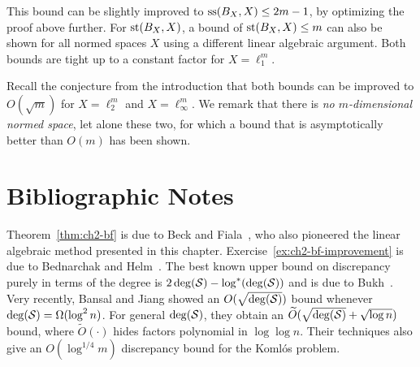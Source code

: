 
\remark
This bound can be slightly improved to \(\operatorname{ss}(B_X, X)\le 2m-1\), by optimizing the proof above further.
For $\operatorname{st}(B_X, X)$, a bound of \(\operatorname{st}(B_X, X) \le m\) can also be shown for all
normed spaces \(X\) using a different linear algebraic argument. Both bounds are tight up to a constant factor for \(X =
\ell_1^m\). 

Recall the conjecture from the introduction that both bounds can be improved to
\(O(\sqrt{m})\) for \(X = \ell_2^m\) and \(X = \ell_\infty^m\). We remark that
there is \emph{no \(m\)-dimensional normed space}, let alone these
two, for which a bound that is asymptotically better than \(O(m)\) has been shown. 

\section{Bibliographic Notes}

Theorem~\ref{thm:ch2-bf} is due to Beck and Fiala~\cite{BF81}, who
also pioneered the linear algebraic method presented in this
chapter. Exercise~\ref{ex:ch2-bf-improvement} is due to Bednarchak and
Helm~\cite{BH97-beckfiala}. The best known upper bound on discrepancy purely in terms of
the degree is $2\operatorname{deg}(\mathcal{S}) - \log^*(\operatorname{deg}(\mathcal{S}))$ and is due to
Bukh~\cite{Bukh16}. Very recently, Bansal and Jiang showed an $O(\sqrt{\operatorname{deg}(\mathcal{S})})$ bound whenever $\operatorname{deg}(\mathcal{S}) = \Omega(\log^2n)$. For general $\operatorname{deg}(\mathcal{S})$, they obtain an $\widetilde{O}(\sqrt{\operatorname{deg}(\mathcal{S})} + \sqrt{\log n})$ bound, where $\widetilde{O}(\cdot)$ hides factors polynomial in $\log \log n$.
Their techniques also give an $O(\log^{1/4} m)$ discrepancy bound for the Koml\'{o}s problem.


